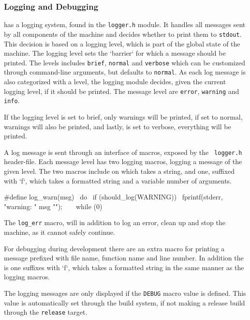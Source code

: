 \subsubsection{Logging and Debugging}
\label{sec:implementation:core:debug}

\thename{} has a logging system, found in the {\tt logger.h} module. It handles
all messages sent by all components of the machine and decides whether to print
them to {\tt stdout}. This decision is based on a logging level, which is part
of the global state of the machine. The logging level sets the `barrier` for
which a message should be printed. The levels includes {\tt brief}, {\tt normal}
and {\tt verbose} which can be customized through command-line arguments, but
defaults to {\tt normal}. As each log message is also categorized with a level,
the logging module decides, given the current logging level, if it should be
printed. The message level are {\tt error}, {\tt warning} and {\tt info}.

If the logging level is set to brief, only warnings will be printed, if set to
normal, warnings will also be printed, and lastly, is set to verbose, everything
will be printed.

A log message is sent through an interface of macros, exposed by the {\tt
  logger.h} header-file. Each message level has two logging macros, logging a
message of the given level. The two macros include on which takes a string, and
one, suffixed with `f`, which takes a formatted string and a variable number of
arguments.
\begin{ccode}
#define log_warn(msg)                             \
  do {                                            \
      if (should_log(WARNING)) {                  \
          fprintf(stderr, "warning: " msg "\n");  \
      }                                           \
  } while (0)
\end{ccode}

The {\tt log\_err} macro, will in addition to log an error, clean up and stop the
machine, as it cannot safely continue.

For debugging during development there are an extra macro for printing a message
prefixed with file name, function name and line number. In addition the is one
suffixes with `f`, which takes a formatted string in the same manner as the
logging macros.

The logging messages are only displayed if the {\tt DEBUG} macro value is
defined. This value is automatically set through the build system, if not making
a release build through the {\tt release} target.



